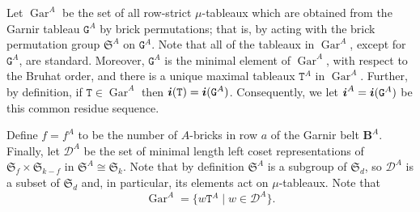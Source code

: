 \documentclass[twoside,11pt,reqno]{amsart}
\numberwithin{equation}{section}
\theoremstyle{definition}  %
\def\bi{\text{\boldmath$i$}}
\newcommand{\0}{{\bar 0}}
\newcommand{\1}{{\bar 1}}
\def\Si{\mathfrak{S}}
\def\Belt{\mathbf{B}}
\newcommand{\D}{{\mathscr D}}
\def\T{{\mathtt T}}
\def\G{{\mathtt G}}
\def\Gar{{\operatorname{Gar}}}
\begin{document}
Let $\Gar^A$ be the set of all row-strict $\mu$-tableaux which are obtained from the Garnir tableau $\G^A$ by brick permutations; that is, by acting with the brick permutation group $\Si^A$ on $\G^A$. Note that all of the tableaux in $\Gar^A$, except for $\G^A$, are standard. Moreover, $\G^A$ is the minimal element of $\Gar^A$, with respect to the Bruhat order, and there is a unique maximal tableaux $\T^A$ in $\Gar^A$. Further, by definition, if $\T\in\Gar^A$ then $\bi(\T)=\bi(\G^A)$. Consequently, we let $\bi^A=\bi(\G^A)$ be this common residue sequence. 

Define $f=f^A$ to be the number of $A$-bricks in row $a$ of the Garnir belt $\Belt^A$. Finally, let $\D^A$ be
the set of minimal length left coset representations of $\Si_f\times\Si_{k-f}$ in $\Si^A\cong\Si_k$. Note that by definition $\Si^A$ is a subgroup of $\Si_d$, so $\D^A$ is a subset of $\Si_d$ and, in particular, its elements act on $\mu$-tableaux. Note that
\begin{equation}\label{EGarD}
\Gar^A=\{w\T^A\mid w\in\D^A\}. 
\end{equation}
\end{document}
